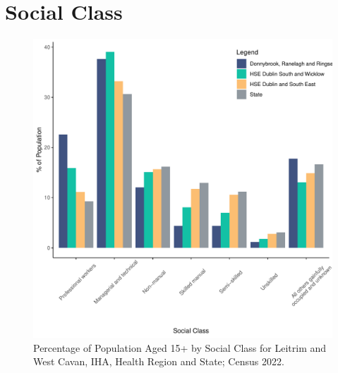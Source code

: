 \documentclass{article}
\begin{document}
\section{Social Class}\label{sect:SC}
\begin{figure}[H]
	\centering
	\includegraphics[width = 140mm]{../figures/SocialClassED.pdf}
	\caption{Percentage of Population Aged 15+ by Social Class for Leitrim and West Cavan, IHA, Health Region and State; Census 2022.}
	\label{fig:vbnv}
	\end{figure}
\end{document}
